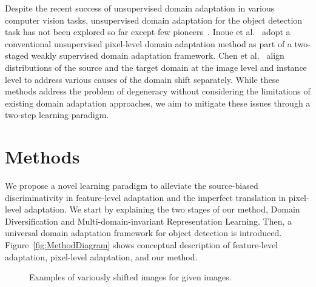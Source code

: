 \documentclass[10pt,twocolumn,letterpaper]{article}
\begin{document}
Despite the recent success of unsupervised domain adaptation in various computer vision tasks, unsupervised domain adaptation for the object detection task has not been explored so far except few pioneers~\cite{Inoue_2018_CVPR,DAFRCNN}. 
Inoue et al.~\cite{Inoue_2018_CVPR} adopt a conventional unsupervised pixel-level domain adaptation method as part of a two-staged weakly supervised domain adaptation framework.
Chen et al.~\cite{DAFRCNN} align distributions of the source and the target domain at the image level and instance level to address various causes of the domain shift separately.
While these methods address the problem of degeneracy without considering the limitations of existing domain adaptation approaches, we aim to mitigate these issues through a two-step learning paradigm.






\section{Methods}
We propose a novel learning paradigm to alleviate the source-biased discriminativity in feature-level adaptation and the imperfect translation in pixel-level adaptation.
We start by explaining the two stages of our method, Domain Diversification and Multi-domain-invariant Representation Learning.
Then, a universal domain adaptation framework for object detection is introduced.
Figure~\ref{fig:MethodDiagram} shows conceptual description of feature-level adaptation, pixel-level adaptation, and our method.

\begin{figure}[t]
\vskip -7pt
\begin{center}
\end{center}\vskip -3pt
  \caption{Examples of variously shifted images for given images.}
\label{fig:ExShift}
\vskip -3pt
\end{figure}
\end{document}
